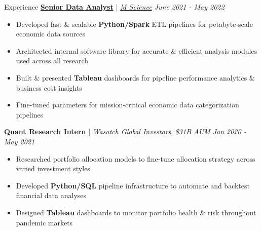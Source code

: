 \documentclass{content/resume/resume}
\begin{document}
\begin{rSection}{Experience}
  \href{https://mscience.com/}{\bf Senior Data Analyst} | {\em \href{https://mscience.com}{M Science} \hfill June 2021 - May 2022}
  \vspace{-6pt}
  \begin{itemize}[nosep]
    \item Developed fast \& scalable {\bf Python/Spark} ETL pipelines for petabyte-scale economic data sources
    \item Architected internal software library for accurate \& efficient analysis modules used across all research
    \item Built \& presented {\bf Tableau} dashboards for pipeline performance analytics \& business cost insights
    \item Fine-tuned parameters for mission-critical economic data categorization pipelines
  \end{itemize}

  \href{https://wasatchglobal.com/}{\bf Quant Research Intern} | {\em Wasatch Global Investors}, {\em \$31B AUM \hfill Jan 2020 - May 2021}
  \vspace{-6pt}
  \begin{itemize}[nosep]
    \item Researched portfolio allocation models to fine-tune allocation strategy across varied investment styles
    \item Developed {\bf Python/SQL} pipeline infrastructure to automate and backtest financial data analyses
    \item Designed {\bf Tableau} dashboards to monitor portfolio health \& risk throughout pandemic markets
  \end{itemize}


\end{rSection}
\end{document}
